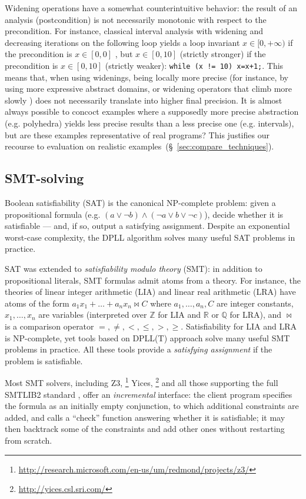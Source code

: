 \documentclass[preprint]{sigplanconf}
\newcommand{\ZZ}{\mathbb{Z}}
\newcommand{\QQ}{\mathbb{Q}}
\newcommand{\RR}{\mathbb{R}}
\begin{document}
Widening operations have a somewhat counterintuitive behavior: the result of an analysis (postcondition) is not necessarily monotonic with respect to the precondition. For instance, classical interval analysis with widening and decreasing iterations on the following loop yields a loop invariant $x \in [0,+\infty)$ if the precondition is $x \in [0,0]$ , but $x \in [0,10]$ (strictly stronger) if the precondition is $x \in [0,10]$ (strictly weaker):
\lstinline|while (x != 10) x=x+1;|.
This means that, when using widenings, being locally more precise (for instance, by using more expressive abstract domains, or widening operators that climb more slowly \cite{BagnaraHRZ05SCP}) does not necessarily translate into higher final precision.
It is almost always possible to concoct examples where a supposedly more precise abstraction (e.g. polyhedra) yields less precise results than a less precise one (e.g. intervals), but are these examples representative of real programs?
This justifies our recourse to evaluation on realistic examples~(\S~\ref{sec:compare_techniques}).

\subsection{SMT-solving}
Boolean satisfiability (SAT) is the canonical NP-complete problem: given a propositional formula (e.g. $(a \lor \neg b) \land (\neg a \lor b \lor \neg c)$), decide whether it is satisfiable --- and, if so, output a satisfying assignment.
Despite an exponential worst-case complexity, the DPLL algorithm \cite{Kroening_Strichman_08,Handbook_SAT} solves many useful SAT problems in practice.

SAT was extended to \emph{satisfiability modulo theory} (SMT): in addition to propositional literals, SMT formulas admit atoms from a theory.
For instance, the theories of linear integer arithmetic (LIA) and linear real arithmetic (LRA) have atoms of the form $a_1 x_1 + \dots + a_n x_n \bowtie C$ where $a_1,\dots,a_n,C$ are integer constants, $x_1,\dots,x_n$ are variables (interpreted over $\ZZ$ for LIA and $\RR$ or $\QQ$ for LRA), and $\bowtie$ is a comparison operator $=,\neq,<,\leq,>,\geq$.
Satisfiability for LIA and LRA is NP-complete, yet tools based on DPLL(T) approach \cite{Kroening_Strichman_08,Handbook_SAT} solve many useful SMT problems in practice. All these tools provide a \emph{satisfying assignment} if the problem is satisfiable.

Most SMT solvers, including Z3,%
\footnote{\url{http://research.microsoft.com/en-us/um/redmond/projects/z3/}}
Yices,%
\footnote{\url{http://yices.csl.sri.com/}}
and all those supporting the full SMTLIB2 standard \cite{BarST-SMTLIB},
offer an \emph{incremental} interface: the client program specifies the formula as an initially empty conjunction, to which additional constraints are added, and calls a ``check'' function answering whether it is satisfiable; 
it may then backtrack some of the constraints and add other ones without restarting from scratch.
\end{document}
